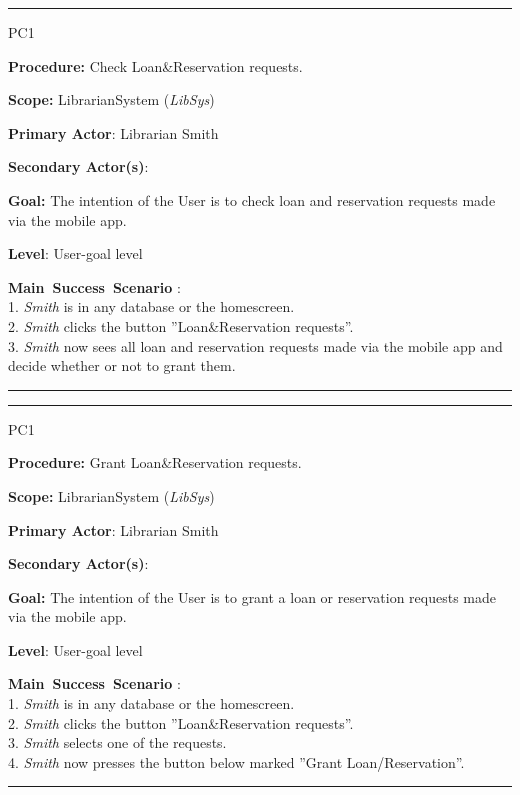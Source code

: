 \vspace{0.5cm}
\hrule
\begin{lyxlist}{PC1}
\small{
\item [\textbf{Procedure:}] Check Loan\&Reservation requests.
\item [\textbf{Scope:}] LibrarianSystem (\emph{LibSys})
\item [\textbf{Primary Actor}:] Librarian Smith
\item [\textbf{Secondary Actor(s)}:] 
\item [\textbf{Goal:}] The intention of the User is to check loan and
reservation requests made via the mobile app.
\item [\textbf{Level}:] User-goal level
\item [\textbf{Main~Success~Scenario}]:\\
1. \emph{Smith} is in any database or the homescreen.\\
2. \emph{Smith} clicks the button ''Loan\&Reservation requests''.\\
3. \emph{Smith} now sees all loan and reservation requests made via the
mobile app and decide whether or not to grant them.\\

}

\end{lyxlist}
\hrule


\vspace{0.5cm}
\hrule
\begin{lyxlist}{PC1}
\small{
\item [\textbf{Procedure:}] Grant Loan\&Reservation requests.
\item [\textbf{Scope:}] LibrarianSystem (\emph{LibSys})
\item [\textbf{Primary Actor}:] Librarian Smith
\item [\textbf{Secondary Actor(s)}:] 
\item [\textbf{Goal:}] The intention of the User is to grant a loan or
reservation requests made via the mobile app.
\item [\textbf{Level}:] User-goal level
\item [\textbf{Main~Success~Scenario}]:\\
1. \emph{Smith} is in any database or the homescreen.\\
2. \emph{Smith} clicks the button ''Loan\&Reservation requests''.\\
3. \emph{Smith} selects one of the requests.\\
4. \emph{Smith} now presses the button below marked ''Grant
Loan/Reservation''.\\

}

\end{lyxlist}
\hrule

